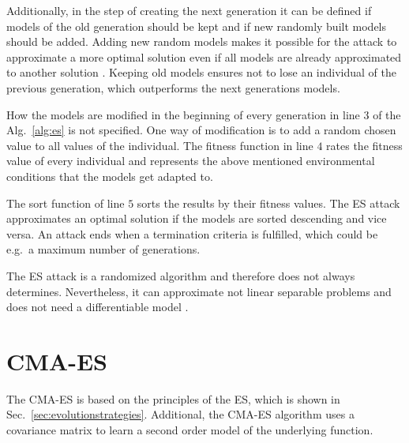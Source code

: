 Additionally, in the step of creating the next generation it can be defined if models of the old generation should be kept and if new randomly built models should be added. %
Adding new random models makes it possible for the attack to approximate a more optimal solution even if all models are already approximated to another solution \cite{Rechenberg1994EvolutionsstrategiePrinzipien}.
Keeping old models ensures not to lose an individual of the previous generation, which outperforms the next generations models.

How the models are modified in the beginning of every generation in line $3$ of the Alg.\ \ref{alg:es} is not specified.
One way of modification is to add a random chosen value to all values of the individual. %
The fitness function in line $4$ rates the fitness value of every individual and represents the above mentioned environmental conditions that the models get adapted to. %

The sort function of line $5$ sorts the results by their fitness values.
The \ac{ES} attack approximates an optimal solution if the models are sorted descending and vice versa. %
An attack ends when a termination criteria is fulfilled, which could be e.g.\ a maximum number of generations.

The \ac{ES} attack is a randomized algorithm and therefore does not always determines.
Nevertheless, it can approximate not linear separable problems and does not need a differentiable model \cite{Ruhrmair2010ModelingFunctions}.
\pagebreak


\section{CMA-ES}
\label{sec:cma-es}

The \acf{CMA-ES} is based on the principles of the \ac{ES}, which is shown in Sec.\ \ref{sec:evolutionstrategies}.
Additional, the \ac{CMA-ES} algorithm uses a covariance matrix to learn a second order model of the underlying function.

